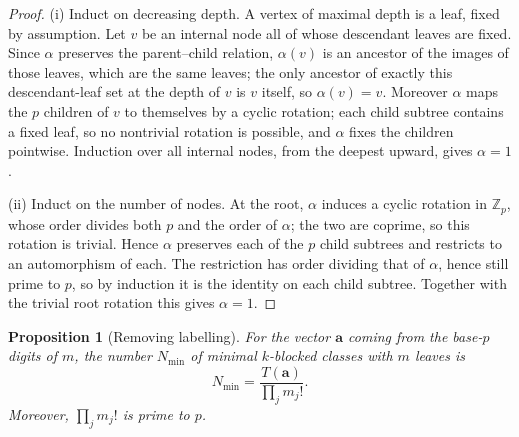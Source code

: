 \documentclass[11pt]{article}
\newtheorem{proposition}[theorem]{Proposition}
\theoremstyle{definition}
\theoremstyle{remark}
\numberwithin{equation}{section}
\numberwithin{figure}{section}
\newcommand{\Z}{\mathbb Z}
\begin{document}
\begin{proof}
(i) Induct on decreasing depth.  A vertex of maximal depth is a leaf, fixed by assumption.  Let $v$ be an internal node all of whose descendant leaves are fixed.  Since $\alpha$ preserves the parent--child relation, $\alpha(v)$ is an ancestor of the images of those leaves, which are the same leaves; the only ancestor of exactly this descendant-leaf set at the depth of $v$ is $v$ itself, so $\alpha(v)=v$.  Moreover $\alpha$ maps the $p$ children of $v$ to themselves by a cyclic rotation; each child subtree contains a fixed leaf, so no nontrivial rotation is possible, and $\alpha$ fixes the children pointwise.  Induction over all internal nodes, from the deepest upward, gives $\alpha=1$.

(ii) Induct on the number of nodes.  At the root, $\alpha$ induces a cyclic rotation in $\Z_p$, whose order divides both $p$ and the order of $\alpha$; the two are coprime, so this rotation is trivial.  Hence $\alpha$ preserves each of the $p$ child subtrees and restricts to an automorphism of each.  The restriction has order dividing that of $\alpha$, hence still prime to $p$, so by induction it is the identity on each child subtree.  Together with the trivial root rotation this gives $\alpha=1$.
\end{proof}
\begin{proposition}[Removing labelling]\label{main:prop:free}
For the vector $\mathbf a$ coming from the base-$p$ digits of $m$, the number $N_{\min}$ of minimal $k$-blocked classes with $m$ leaves is
\[
 N_{\min}=\frac{T(\mathbf a)}{\prod_jm_j!}.
\]
Moreover, $\prod_jm_j!$ is prime to $p$.
\end{proposition}
\end{document}
